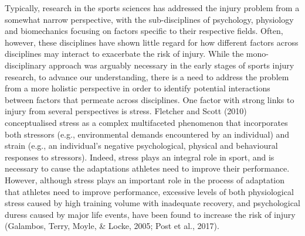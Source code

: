 \documentclass[man,floatsintext]{apa6}
\begin{document}
Typically, research in the sports sciences has addressed the injury problem from a somewhat narrow perspective, with the sub-disciplines of psychology, physiology and biomechanics focusing on factors specific to their respective fields.
Often, however, these disciplines have shown little regard for how different factors across disciplines may interact to exacerbate the risk of injury.
While the mono-disciplinary approach was arguably necessary in the early stages of sports injury research, to advance our understanding, there is a need to address the problem from a more holistic perspective in order to identify potential interactions between factors that permeate across disciplines.
One factor with strong links to injury from several perspectives is stress.
Fletcher and Scott (2010) conceptualised stress as a complex multifaceted phenomenon that incorporates both stressors (e.g., environmental demands encountered by an individual) and strain (e.g., an individual's negative psychological, physical and behavioural responses to stressors).
Indeed, stress plays an integral role in sport, and is necessary to cause the adaptations athletes need to improve their performance.
However, although stress plays an important role in the process of adaptation that athletes need to improve performance, excessive levels of both physiological stress caused by high training volume with inadequate recovery, and psychological duress caused by major life events, have been found to increase the risk of injury (Galambos, Terry, Moyle, \& Locke, 2005; Post et al., 2017).
\end{document}
